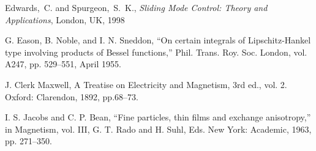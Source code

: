 Edwards,~C. and Spurgeon,~S.~K., \emph{Sliding Mode Control: Theory and Applications}, London, UK, 1998

G. Eason, B. Noble, and I. N. Sneddon, ``On certain integrals of Lipschitz-Hankel type involving products of Bessel functions,'' Phil. Trans. Roy. Soc. London, vol. A247, pp. 529--551, April 1955.

J. Clerk Maxwell, A Treatise on Electricity and Magnetism, 3rd ed., vol. 2. Oxford: Clarendon, 1892, pp.68--73.

I. S. Jacobs and C. P. Bean, ``Fine particles, thin films and exchange anisotropy,'' in Magnetism, vol. III, G. T. Rado and H. Suhl, Eds. New York: Academic, 1963, pp. 271--350.